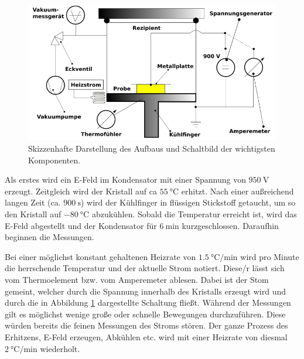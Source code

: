 \begin{figure}
    \centering
    \includegraphics[width=\textwidth]{Bilder/Zeichnung.PNG}
    \caption{Skizzenhafte Darstellung des Aufbaus und Schaltbild der wichtigsten Komponenten.}
    \label{fig:skizze}
\end{figure}


Als erstes wird ein E-Feld im Kondensator mit einer Spannung von $\SI{950}{\volt}$ erzeugt. Zeitgleich wird der Kristall auf ca $\SI{55}{\celsius}$ erhitzt. Nach einer außreichend langen Zeit (ca. $\SI{900}{\second}$) wird der Kühlfinger in flüssigen Stickstoff getaucht, um so den Kristall auf $\SI{-80}{\celsius}$ abzukühlen. Sobald die Temperatur erreicht ist, wird das E-Feld abgestellt und der Kondensator für $\SI{6}{\minute}$ kurzgeschlossen. Daraufhin beginnen die Messungen.


Bei einer möglichst konstant gehaltenen Heizrate von $\SI{1.5}{\celsius\per\minute}$ wird pro Minute die herrschende Temperatur und der aktuelle Strom notiert. Diese/r lässt sich vom Thermoelement bzw. vom Amperemeter ablesen. Dabei ist der Stom gemeint, welcher durch die Spannung innerhalb des Kristalls erzeugt wird und durch die in Abbildung \ref{fig:skizze} dargestellte Schaltung fließt. Während der Messungen gilt es möglichst wenige große oder schnelle Bewegungen durchzuführen. Diese würden bereits die feinen Messungen des Stroms stören. 
Der ganze Prozess des Erhitzens, E-Feld erzeugen, Abkühlen etc. wird mit einer Heizrate von diesmal $\SI{2}{\celsius\per\minute}$ wiederholt.

